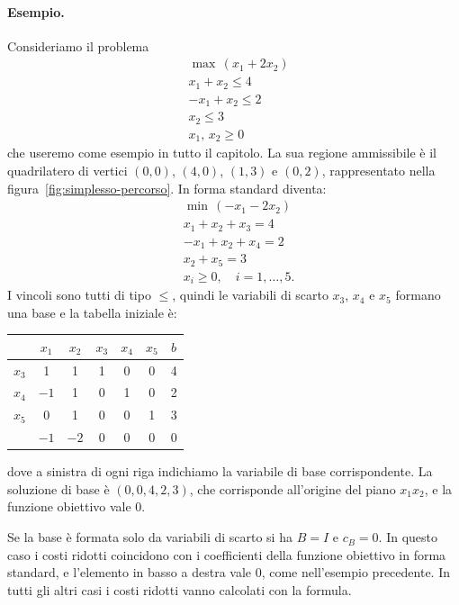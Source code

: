 \paragraph{Esempio.}
Consideriamo il problema
\[
\begin{aligned}
&\max\, (x_1 + 2x_2) \\
&x_1 + x_2 \le 4 \\
&{-x_1} + x_2 \le 2 \\
&x_2 \le 3 \\
&x_1,\, x_2 \ge 0
\end{aligned}
\]
che useremo come esempio in tutto il capitolo. La sua regione ammissibile è il quadrilatero di vertici $(0,0)$, $(4,0)$, $(1,3)$ e $(0,2)$, rappresentato nella figura~\ref{fig:simplesso-percorso}. In forma standard diventa:
\[
\begin{aligned}
&\min\, (-x_1 - 2x_2) \\
&x_1 + x_2 + x_3 = 4 \\
&{-x_1} + x_2 + x_4 = 2 \\
&x_2 + x_5 = 3 \\
&x_i \ge 0, \quad i = 1, \dots, 5.
\end{aligned}
\]
I vincoli sono tutti di tipo $\le$, quindi le variabili di scarto $x_3$, $x_4$ e $x_5$ formano una base e la tabella iniziale è:
\begin{center}
\begin{tabular}{c|ccccc|c}
 & $x_1$ & $x_2$ & $x_3$ & $x_4$ & $x_5$ & $b$ \\
\hline
$x_3$ & 1 & 1 & 1 & 0 & 0 & 4 \\
$x_4$ & $-1$ & 1 & 0 & 1 & 0 & 2 \\
$x_5$ & 0 & 1 & 0 & 0 & 1 & 3 \\
\hline
 & $-1$ & $-2$ & 0 & 0 & 0 & 0 \\
\end{tabular}
\end{center}
dove a sinistra di ogni riga indichiamo la variabile di base corrispondente. La soluzione di base è $(0, 0, 4, 2, 3)$, che corrisponde all'origine del piano $x_1 x_2$, e la funzione obiettivo vale $0$.

\begin{osservazione}
Se la base è formata solo da variabili di scarto si ha $B = I$ e $c_B = 0$. In questo caso i costi ridotti coincidono con i coefficienti della funzione obiettivo in forma standard, e l'elemento in basso a destra vale $0$, come nell'esempio precedente. In tutti gli altri casi i costi ridotti vanno calcolati con la formula.
\end{osservazione}

